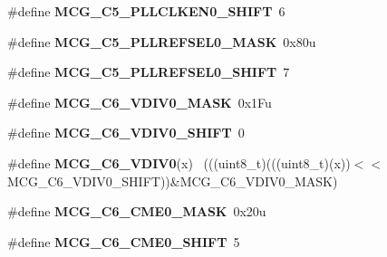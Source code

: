 \begin{DoxyCompactItemize}
\item 
\hypertarget{group___m_c_g___register___masks_gaa66ceed70e1055a31e46c60a502b8eb7}{}\#define {\bfseries M\+C\+G\+\_\+\+C5\+\_\+\+P\+L\+L\+C\+L\+K\+E\+N0\+\_\+\+S\+H\+I\+F\+T}~6\label{group___m_c_g___register___masks_gaa66ceed70e1055a31e46c60a502b8eb7}

\item 
\hypertarget{group___m_c_g___register___masks_ga3d4d2291631b008c6ce02fe70519a401}{}\#define {\bfseries M\+C\+G\+\_\+\+C5\+\_\+\+P\+L\+L\+R\+E\+F\+S\+E\+L0\+\_\+\+M\+A\+S\+K}~0x80u\label{group___m_c_g___register___masks_ga3d4d2291631b008c6ce02fe70519a401}

\item 
\hypertarget{group___m_c_g___register___masks_ga6eea273d8f7e8825cfc42d7e3dd6437a}{}\#define {\bfseries M\+C\+G\+\_\+\+C5\+\_\+\+P\+L\+L\+R\+E\+F\+S\+E\+L0\+\_\+\+S\+H\+I\+F\+T}~7\label{group___m_c_g___register___masks_ga6eea273d8f7e8825cfc42d7e3dd6437a}

\item 
\hypertarget{group___m_c_g___register___masks_gacf93ac207865bd372d9148f10dce7267}{}\#define {\bfseries M\+C\+G\+\_\+\+C6\+\_\+\+V\+D\+I\+V0\+\_\+\+M\+A\+S\+K}~0x1\+Fu\label{group___m_c_g___register___masks_gacf93ac207865bd372d9148f10dce7267}

\item 
\hypertarget{group___m_c_g___register___masks_ga92208f56fc7ce68a0a8ff14ab5c3b2f6}{}\#define {\bfseries M\+C\+G\+\_\+\+C6\+\_\+\+V\+D\+I\+V0\+\_\+\+S\+H\+I\+F\+T}~0\label{group___m_c_g___register___masks_ga92208f56fc7ce68a0a8ff14ab5c3b2f6}

\item 
\hypertarget{group___m_c_g___register___masks_gaa423a05479c6b93636da999ad7738cec}{}\#define {\bfseries M\+C\+G\+\_\+\+C6\+\_\+\+V\+D\+I\+V0}(x)                                                ~(((uint8\+\_\+t)(((uint8\+\_\+t)(x))$<$$<$M\+C\+G\+\_\+\+C6\+\_\+\+V\+D\+I\+V0\+\_\+\+S\+H\+I\+F\+T))\&M\+C\+G\+\_\+\+C6\+\_\+\+V\+D\+I\+V0\+\_\+\+M\+A\+S\+K)\label{group___m_c_g___register___masks_gaa423a05479c6b93636da999ad7738cec}

\item 
\hypertarget{group___m_c_g___register___masks_ga2e0daa102ec3f225ed9297f7bc9f8239}{}\#define {\bfseries M\+C\+G\+\_\+\+C6\+\_\+\+C\+M\+E0\+\_\+\+M\+A\+S\+K}~0x20u\label{group___m_c_g___register___masks_ga2e0daa102ec3f225ed9297f7bc9f8239}

\item 
\hypertarget{group___m_c_g___register___masks_ga096e62e71f69f5b749999d671d800090}{}\#define {\bfseries M\+C\+G\+\_\+\+C6\+\_\+\+C\+M\+E0\+\_\+\+S\+H\+I\+F\+T}~5\label{group___m_c_g___register___masks_ga096e62e71f69f5b749999d671d800090}


\end{DoxyCompactItemize}
